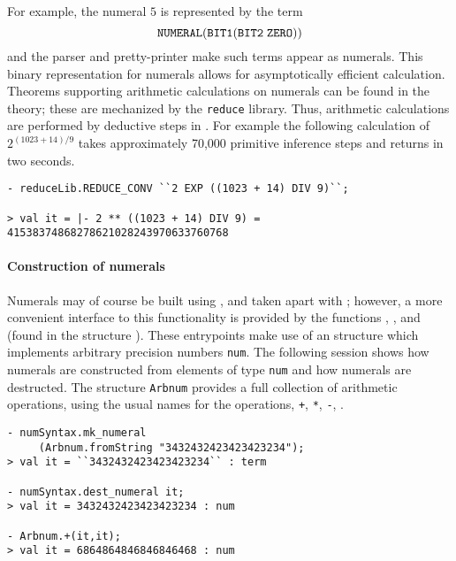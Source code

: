 \noindent For example, the numeral $5$ is represented by the term
\[
   \ml{NUMERAL}(\ml{BIT1}(\ml{BIT2}\;\ml{ZERO}))
\]
and the \HOL{} parser and pretty-printer make such terms appear as
numerals. This binary representation for numerals allows for
asymptotically efficient calculation. Theorems supporting arithmetic
calculations on numerals can be found in the 
theory; these are mechanized by the \verb+reduce+ library. Thus,
arithmetic calculations are performed by deductive steps in \HOL.
For example the following calculation of $2 ^{(1023 + 14)/9}$ takes
approximately 70,000 primitive inference steps and returns in two
seconds.
%
\begin{boxed}
{\small
\begin{verbatim}
- reduceLib.REDUCE_CONV ``2 EXP ((1023 + 14) DIV 9)``;

> val it = |- 2 ** ((1023 + 14) DIV 9) = 41538374868278621028243970633760768
\end{verbatim}
}
\end{boxed}

\paragraph {Construction of numerals}

Numerals may of course be built using , and taken apart with
; however, a more convenient interface to this
functionality is provided by the functions ,
, and  (found in the structure
). These entrypoints make use of an \ML{} structure
 which implements arbitrary precision numbers {\verb+num+}. The
following session shows how \HOL{} numerals are constructed from elements of
type \verb+num+ and how numerals are destructed. The structure
{\small\verb+Arbnum+} provides a full collection of arithmetic
operations, using the usual names for the operations, \eg \verb|+|,
\verb|*|, \verb|-|, \etc.

\begin{boxed}
\begin{verbatim}
- numSyntax.mk_numeral
     (Arbnum.fromString "3432432423423423234");
> val it = ``3432432423423423234`` : term

- numSyntax.dest_numeral it;
> val it = 3432432423423423234 : num

- Arbnum.+(it,it);
> val it = 6864864846846846468 : num
\end{verbatim}
\end{boxed}

